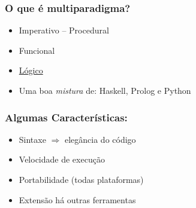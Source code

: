 \documentclass[10pt]{beamer}
\begin{document}

\begin{frame}
    \frametitle{O que é multiparadigma?}

    \begin{itemize}
      \item Imperativo -- Procedural
      \item Funcional
      \item \underline{Lógico}
      \item Uma boa \textit{mistura} de: Haskell, Prolog e Python

    \end{itemize}

\end{frame}


\begin{frame}
    \frametitle{Algumas Características:}

    \begin{itemize}
    
      \item Sintaxe $\Rightarrow $ elegância do código
      \item Velocidade de execução
      \item Portabilidade (todas plataformas)
      \item Extensão há outras ferramentas
      
    \end{itemize}
\end{frame}



\end{document}
